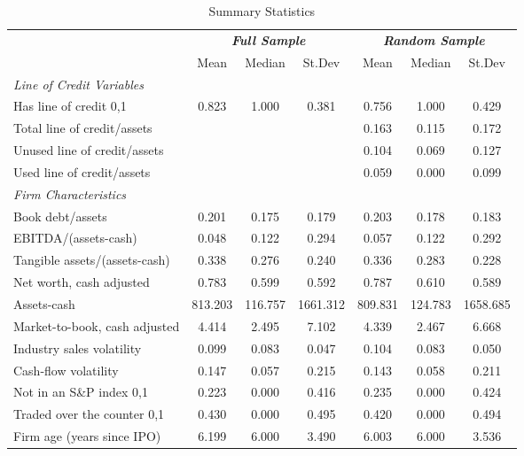 \def\sym#1{\ifmmode^{#1}\else\(^{#1}\)\fi}

\begin{table}[htbp]
    \centering
    \caption{Summary Statistics}
    \begin{tabular}{l*{3}{c}*{3}{c}}
    \toprule
                    &\multicolumn{3}{c}{\textbf{\emph{Full Sample}}} & \multicolumn{3}{c}{\textbf{\emph{Random Sample}}} \\
                    & \multicolumn{1}{c}{{Mean}} & \multicolumn{1}{c}{{Median}} & \multicolumn{1}{c}{{St.Dev}} & 
                     \multicolumn{1}{c}{{Mean}} & \multicolumn{1}{c}{{Median}} & \multicolumn{1}{c}{{St.Dev}} \\
    \midrule
    \textit{Line of Credit Variables} & & & & & & \\
    Has line of credit {0,1}          & 0.823  & 1.000 & 0.381 & 0.756  & 1.000 & 0.429 \\
    Total line of credit/assets       &        &       &       & 0.163  & 0.115 & 0.172 \\
    Unused line of credit/assets      &        &       &       & 0.104  & 0.069 & 0.127 \\
    Used line of credit/assets        &        &       &       & 0.059  & 0.000 & 0.099 \\
    \textit{Firm Characteristics}     &       &      &      &       &      &      \\
    Book debt/assets                  & 0.201  & 0.175 & 0.179 & 0.203  & 0.178 & 0.183 \\
    EBITDA/(assets-cash)              & 0.048  & 0.122 & 0.294 & 0.057  & 0.122 & 0.292 \\
    Tangible assets/(assets-cash)     & 0.338  & 0.276 & 0.240 & 0.336  & 0.283 & 0.228 \\
    Net worth, cash adjusted          & 0.783  & 0.599 & 0.592 & 0.787  & 0.610 & 0.589 \\
    Assets-cash                       & 813.203 & 116.757 & 1661.312 & 809.831 & 124.783 & 1658.685 \\
    Market-to-book, cash adjusted     & 4.414  & 2.495 & 7.102 & 4.339  & 2.467 & 6.668 \\
    Industry sales volatility         & 0.099  & 0.083 & 0.047 & 0.104  & 0.083 & 0.050 \\
    Cash-flow volatility              & 0.147  & 0.057 & 0.215 & 0.143  & 0.058 & 0.211 \\
    Not in an S\&P index {0,1}        & 0.223  & 0.000 & 0.416 & 0.235  & 0.000 & 0.424 \\
    Traded over the counter {0,1}     & 0.430  & 0.000 & 0.495 & 0.420  & 0.000 & 0.494 \\
    Firm age (years since IPO)        & 6.199  & 6.000 & 3.490 & 6.003  & 6.000 & 3.536 \\
    \bottomrule
    \end{tabular}
\end{table}

